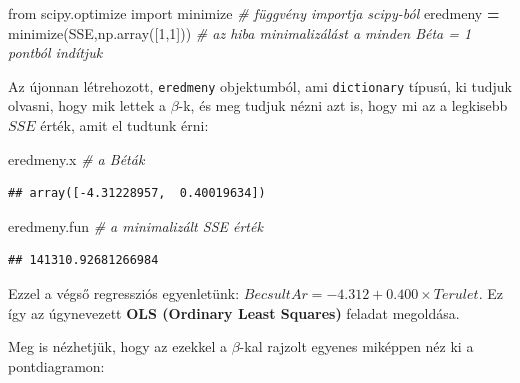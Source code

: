 \documentclass[
]{book}
\newenvironment{Shaded}{\begin{snugshade}}{\end{snugshade}}
\newcommand{\CommentTok}[1]{\textcolor[rgb]{0.56,0.35,0.01}{\textit{#1}}}
\newcommand{\DecValTok}[1]{\textcolor[rgb]{0.00,0.00,0.81}{#1}}
\newcommand{\ImportTok}[1]{#1}
\newcommand{\NormalTok}[1]{#1}
\newcommand{\OperatorTok}[1]{\textcolor[rgb]{0.81,0.36,0.00}{\textbf{#1}}}
\begin{document}
\begin{Shaded}
\begin{Highlighting}[]
\ImportTok{from}\NormalTok{ scipy.optimize }\ImportTok{import}\NormalTok{ minimize }\CommentTok{\# függvény importja scipy{-}ból}
\NormalTok{eredmeny }\OperatorTok{=}\NormalTok{ minimize(SSE,np.array([}\DecValTok{1}\NormalTok{,}\DecValTok{1}\NormalTok{])) }\CommentTok{\# az hiba minimalizálást a minden Béta = 1 pontból indítjuk}
\end{Highlighting}
\end{Shaded}

Az újonnan létrehozott, \texttt{eredmeny} objektumból, ami \texttt{dictionary} típusú, ki tudjuk olvasni, hogy mik lettek a \(\beta\)-k, és meg tudjuk nézni azt is, hogy mi az a legkisebb \(SSE\) érték, amit el tudtunk érni:

\begin{Shaded}
\begin{Highlighting}[]
\NormalTok{eredmeny.x }\CommentTok{\# a Béták}
\end{Highlighting}
\end{Shaded}

\begin{verbatim}
## array([-4.31228957,  0.40019634])
\end{verbatim}

\begin{Shaded}
\begin{Highlighting}[]
\NormalTok{eredmeny.fun }\CommentTok{\# a minimalizált SSE érték}
\end{Highlighting}
\end{Shaded}

\begin{verbatim}
## 141310.92681266984
\end{verbatim}

Ezzel a végső regressziós egyenletünk: \(BecsultAr=-4.312 + 0.400\times Terulet\). Ez így az úgynevezett \textbf{OLS (Ordinary Least Squares)} feladat megoldása.

Meg is nézhetjük, hogy az ezekkel a \(\beta\)-kal rajzolt egyenes miképpen néz ki a pontdiagramon:
\end{document}
